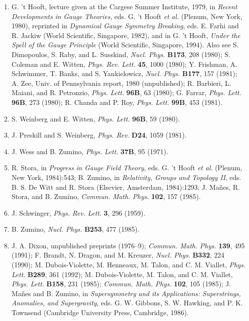 \begin{enumerate}
\item {}\label{ch22-ref-16}
G. 't Hooft, lecture given at the Cargese Summer Institute, 1979, in
\emph{Recent Developments in Gauge Theories}, eds. G. 't Hooft
\emph{et al.} (Plenum, New York, 1980), reprinted in
\emph{Dynamical Gauge Symmetry Breaking}, eds. E. Farhi and R. Jackiw
(World Scientific, Singapore, 1982), and in G. 't Hooft,
\emph{Under the Spell of the Gauge Principle} (World Scientific,
Singapore, 1994). Also see S. Dimopoulos, S. Raby, and L. Susskind,
\emph{Nucl. Phys.} \textbf{B173}, 208 (1980); S. Coleman and
E. Witten, \emph{Phys. Rev. Lett.} \textbf{45}, 1000 (1980);
Y. Frishman, A. Schwimmer, T. Banks, and S. Yankielowicz,
\emph{Nucl. Phys.} \textbf{B177}, 157 (1981); A. Zee, Univ. of
Pennsylvania report, 1980 (unpublished); R. Barbieri, L. Maiani, and
R. Petronzio, \emph{Phys. Lett.} \textbf{96B}, 63 (1980); G. Farrar,
\emph{Phys. Lett.} \textbf{96B}, 273 (1980); R. Chanda and P. Roy,
\emph{Phys. Lett.} \textbf{99B}, 453 (1981).

\item[16a.] \label{ch22-ref-16a}
S. Weinberg and E. Witten, \emph{Phys. Lett.} \textbf{96B}, 59 (1980).

\item {}\label{ch22-ref-17}
J. Preskill and S. Weinberg, \emph{Phys. Rev.} \textbf{D24}, 1059 (1981).

\item {}\label{ch22-ref-18}
J. Wess and B. Zumino, \emph{Phys. Lett.} \textbf{37B}, 95 (1971).

\item[18a.] \label{ch22-ref-18a}
R. Stora, in \emph{Progress in Gauge Field Theory}, eds. G. 't Hooft
\emph{et al.} (Plenum, New York, 1984):543; B. Zumino, in
\emph{Relativity, Groups and Topology II}, eds. B. S. De Witt and
R. Stora (Elsevier, Amsterdam, 1984):1293; J. Ma\~nes, R. Stora, and
B. Zumino, \emph{Commun. Math. Phys.} \textbf{102}, 157 (1985).

\item[18b.] \label{ch22-ref-18b}
J. Schwinger, \emph{Phys. Rev. Lett.} \textbf{3}, 296 (1959).

\item[18c.] \label{ch22-ref-18c}
B. Zumino, \emph{Nucl. Phys.} \textbf{B253}, 477 (1985).

\item {}\label{ch22-ref-19}
J. A. Dixon, unpublished preprints (1976--9); \emph{Commun. Math. Phys.}
\textbf{139}, 495 (1991); F. Brandt, N. Dragon, and M. Kreuzer,
\emph{Nucl. Phys.} \textbf{B332}, 224 (1990); M. Dubois-Violette,
M. Henneaux, M. Talon, and C. M. Viallet, \emph{Phys. Lett.}
\textbf{B289}, 361 (1992); M. Dubois-Violette, M. Talon, and
C. M. Viallet, \emph{Phys. Lett.} \textbf{B158}, 231 (1985);
\emph{Commun. Math. Phys.} \textbf{102}, 105 (1985); J. Ma\~nes and
B. Zumino, in \emph{Supersymmetry and its Applications: Superstrings,
Anomalies, and Supergravity}, eds. G. W. Gibbons, S. W. Hawking, and
P. K. Townsend (Cambridge University Press, Cambridge, 1986).


\end{enumerate}
